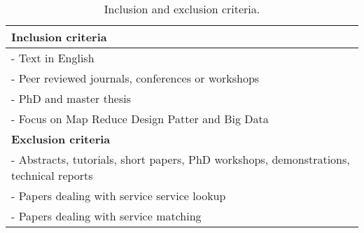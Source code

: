  
\begin{table}\centering \small
\begin{tabular}{|l|} \hline
\textbf{Inclusion criteria}		\\ \hline\hline
- Text in English								\\ \hline
- Peer reviewed journals, conferences or workshops	\\ \hline
- PhD and master thesis	\\ \hline
- Focus on Map Reduce Design Patter and Big Data				\\ \hline\hline
\textbf{Exclusion criteria}		\\ \hline\hline	
- Abstracts, tutorials, short papers, PhD workshops, demonstrations, technical reports		\\ \hline	
- Papers dealing with service service lookup		\\ \hline
- Papers dealing with service matching 	\\ \hline
\end{tabular}
\caption{\label{table:criteria} Inclusion and exclusion criteria.}
\end{table}
